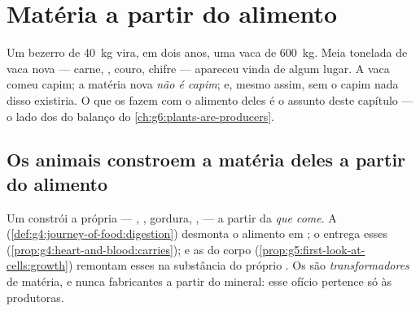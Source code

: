 \chapter{Matéria a partir do alimento}\label{ch:g6:matter-from-food}

Um bezerro de \qty{40}{kg} vira, em dois anos, uma vaca de
\qty{600}{kg}. Meia tonelada de vaca nova --- carne, , couro,
chifre --- apareceu vinda de algum lugar. A vaca comeu capim; a
matéria nova \emph{não é capim}; e, mesmo assim, sem o capim nada
disso existiria. O que os  fazem com o alimento deles é o
assunto deste capítulo --- o lado dos  do balanço do
\cref{ch:g6:plants-are-producers}.

\section{Os animais constroem a matéria deles a partir do alimento}

\begin{proposition}\label{prop:g6:matter-from-food:transform}
Um  constrói a própria  --- , ,
gordura, ,  --- a partir da \emph{ que
come}. A  (\cref{def:g4:journey-of-food:digestion}) desmonta
o alimento em ; o  entrega esses 
(\cref{prop:g4:heart-and-blood:carries}); e as  do corpo
(\cref{prop:g5:first-look-at-cells:growth}) remontam esses 
na substância do próprio . Os  são
\emph{transformadores} de matéria, e nunca fabricantes a partir do
mineral: esse ofício pertence só às produtoras.
\end{proposition}
\admitted


